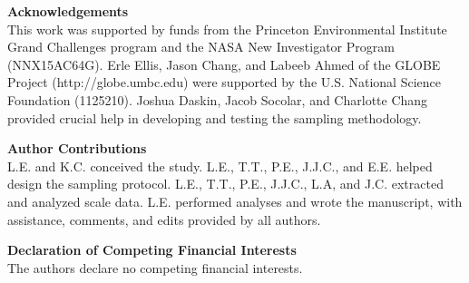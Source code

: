\documentclass[12pt]{article}
\begin{document}
\vspace{10pt}
\noindent \textbf{Acknowledgements} 
\vspace{5pt}
\\
This work was supported by funds from the Princeton Environmental Institute Grand Challenges program and the NASA New Investigator Program (NNX15AC64G). Erle Ellis, Jason Chang, and Labeeb Ahmed of the GLOBE Project (http://globe.umbc.edu) were supported by the U.S. National Science Foundation (1125210). Joshua Daskin, Jacob Socolar, and Charlotte Chang provided crucial help in developing and testing the sampling methodology. 

\vspace{10pt}
\noindent \textbf{Author Contributions} 
\vspace{5pt}
\\
L.E. and K.C. conceived the study. L.E., T.T., P.E., J.J.C., and E.E. helped design the sampling protocol. L.E., T.T., P.E., J.J.C., L.A, and J.C. extracted and analyzed scale data. L.E. performed analyses and wrote the manuscript, with assistance, comments, and edits provided by all authors. 

\vspace{10pt}
\noindent \textbf{Declaration of Competing Financial Interests} 
\vspace{5pt}
\\
The authors declare no competing financial interests. 






\clearpage
\end{document}
